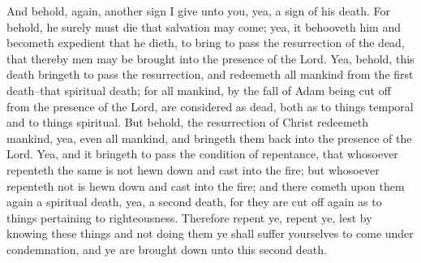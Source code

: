 And behold, again, another sign I give unto you, yea, a sign of his death.
\bverse \iffalse For behold, he surely must die that salvation may come; yea, it behooveth him and becometh expedient that he dieth, to bring to pass the resurrection of the dead, that thereby men may be brought into the presence of the Lord. \fi
For behold, he surely must die that salvation may come; yea, it behooveth him and becometh expedient that he dieth, to bring to pass the resurrection of the dead, that thereby men may be brought into the presence of the Lord.
\bverse \iffalse Yea, behold, this death bringeth to pass the resurrection, and redeemeth all mankind from the first death--that spiritual death; for all mankind, by the fall of Adam being cut off from the presence of the Lord, are considered as dead, both as to things temporal and to things spiritual. \fi
Yea, behold, this death bringeth to pass the resurrection, and redeemeth all mankind from the first death--that spiritual death; for all mankind, by the fall of Adam being cut off from the presence of the Lord, are considered as dead, both as to things temporal and to things spiritual.
\bverse \iffalse But behold, the resurrection of Christ redeemeth mankind, yea, even all mankind, and bringeth them back into the presence of the Lord. \fi
But behold, the resurrection of Christ redeemeth mankind, yea, even all mankind, and bringeth them back into the presence of the Lord.
\bverse \iffalse Yea, and it bringeth to pass the condition of repentance, that whosoever repenteth the same is not hewn down and cast into the fire; but whosoever repenteth not is hewn down and cast into the fire; and there cometh upon them again a spiritual death, yea, a second death, for they are cut off again as to things pertaining to righteousness. \fi
Yea, and it bringeth to pass the condition of repentance, that whosoever repenteth the same is not hewn down and cast into the fire; but whosoever repenteth not is hewn down and cast into the fire; and there cometh upon them again a spiritual death, yea, a second death, for they are cut off again as to things pertaining to righteousness.
\bverse \iffalse Therefore repent ye, repent ye, lest by knowing these things and not doing them ye shall suffer yourselves to come under condemnation, and ye are brought down unto this second death. \fi
Therefore repent ye, repent ye, lest by knowing these things and not doing them ye shall suffer yourselves to come under condemnation, and ye are brought down unto this second death.
